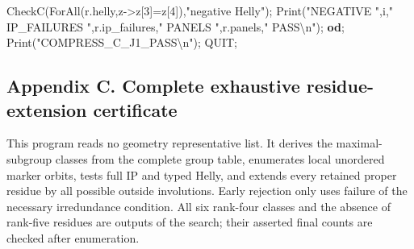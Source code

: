 \documentclass[
  10pt,
  letterpaper,
]{article}
\newenvironment{Shaded}{}{}
\newcommand{\BuiltInTok}[1]{\textcolor[rgb]{0.00,0.50,0.00}{#1}}
\newcommand{\ControlFlowTok}[1]{\textcolor[rgb]{0.00,0.44,0.13}{\textbf{#1}}}
\newcommand{\FloatTok}[1]{\textcolor[rgb]{0.25,0.63,0.44}{#1}}
\newcommand{\NormalTok}[1]{#1}
\newcommand{\OperatorTok}[1]{\textcolor[rgb]{0.40,0.40,0.40}{#1}}
\newcommand{\StringTok}[1]{\textcolor[rgb]{0.25,0.44,0.63}{#1}}
\newcommand{\VariableTok}[1]{\textcolor[rgb]{0.10,0.09,0.49}{#1}}
\begin{document}
\begin{Shaded}
\begin{Highlighting}[]
 \VariableTok{CheckC}\NormalTok{(}\BuiltInTok{ForAll}\NormalTok{(}\VariableTok{r}\NormalTok{.}\VariableTok{helly}\OperatorTok{,}\VariableTok{z}\OperatorTok{{-}\textgreater{}}\VariableTok{z}\NormalTok{[}\FloatTok{3}\NormalTok{]}\OperatorTok{=}\VariableTok{z}\NormalTok{[}\FloatTok{4}\NormalTok{])}\OperatorTok{,}\StringTok{"negative Helly"}\NormalTok{)}\OperatorTok{;}
 \BuiltInTok{Print}\NormalTok{(}\StringTok{"NEGATIVE "}\OperatorTok{,}\VariableTok{i}\OperatorTok{,}\StringTok{" IP\_FAILURES "}\OperatorTok{,}\VariableTok{r}\NormalTok{.}\VariableTok{ip\_failures}\OperatorTok{,}\StringTok{" PANELS "}\OperatorTok{,}\VariableTok{r}\NormalTok{.}\VariableTok{panels}\OperatorTok{,}\StringTok{" PASS\textbackslash{}n"}\NormalTok{)}\OperatorTok{;}
\ControlFlowTok{od}\OperatorTok{;}
\BuiltInTok{Print}\NormalTok{(}\StringTok{"COMPRESS\_C\_J1\_PASS\textbackslash{}n"}\NormalTok{)}\OperatorTok{;}
\VariableTok{QUIT}\OperatorTok{;}
\end{Highlighting}
\end{Shaded}

\subsection{Appendix C. Complete exhaustive residue-extension
certificate}\label{appendix-c.-complete-exhaustive-residue-extension-certificate}

This program reads no geometry representative list. It derives the
maximal-subgroup classes from the complete group table, enumerates local
unordered marker orbits, tests full IP and typed Helly, and extends
every retained proper residue by all possible outside involutions. Early
rejection only uses failure of the necessary irredundance condition. All
six rank-four classes and the absence of rank-five residues are outputs
of the search; their asserted final counts are checked after
enumeration.
\end{document}
